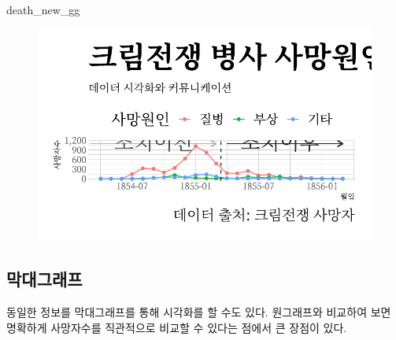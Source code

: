\documentclass[
  letterpaper,
  chapter,a4paper,showtrims,openright,hidelinks]{oblivoir}
\newenvironment{Shaded}{\begin{snugshade}}{\end{snugshade}}
\newcommand{\NormalTok}[1]{\textcolor[rgb]{0.00,0.23,0.31}{#1}}
\begin{document}
\begin{Shaded}
\begin{Highlighting}[]
\NormalTok{death\_new\_gg}
\end{Highlighting}
\end{Shaded}

\begin{figure}[H]

{\centering \includegraphics{cs_nightingale_files/figure-pdf/unnamed-chunk-5-1.pdf}

}

\end{figure}

\hypertarget{uxb9c9uxb300uxadf8uxb798uxd504}{%
\subsection{막대그래프}\label{uxb9c9uxb300uxadf8uxb798uxd504}}

동일한 정보를 막대그래프를 통해 시각화를 할 수도 있다. 원그래프와
비교하여 보면 명확하게 사망자수를 직관적으로 비교할 수 있다는 점에서 큰
장점이 있다.
\end{document}

